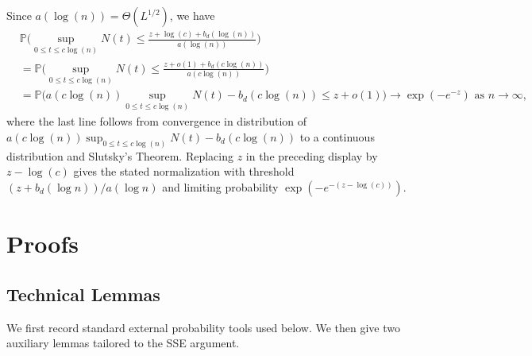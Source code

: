 \documentclass[10pt]{article}
\def\P{\mathbb{P}}
\theoremstyle{definition}
\theoremstyle{remark}
\begin{document}
Since $a(\log(n)) = \Theta(L^{1/2})$, we have
\begin{align*}
    & \P \bigg(\sup_{0 \leq t \leq c \log (n)} N(t)  \leq \frac{z + \log(c) + b_d(\log (n))}{a(\log(n))} \bigg) \\
    & = \P \bigg(\sup_{0 \leq t \leq c \log (n)} N(t)  \leq \frac{z + o(1) + b_d(c\log (n))}{a(c \log(n))} \bigg) \\
    & = \P \bigg(a(c \log(n)) \sup_{0 \leq t \leq c \log (n)} N(t) - b_d(c\log (n)) \leq z + o(1)\bigg)  \rightarrow \exp(-e^{-z}) \text{ as } n \rightarrow \infty,
\end{align*}
where the last line follows from convergence in distribution of $a(c \log(n)) \sup_{0 \leq t \leq c \log (n)} N(t) - b_d(c\log (n))$ to a continuous distribution and Slutsky's Theorem.
Replacing $z$ in the preceding display by $z-\log(c)$ gives the stated normalization with threshold $(z+b_d(\log n))/a(\log n)$ and limiting probability $\exp(-e^{-(z-\log(c))})$.

\section{Proofs}

\subsection{Technical Lemmas}\label{sa-sec:technical-lemmas}

We first record standard external probability tools used below. We then give two auxiliary lemmas tailored to the SSE argument.
\end{document}
